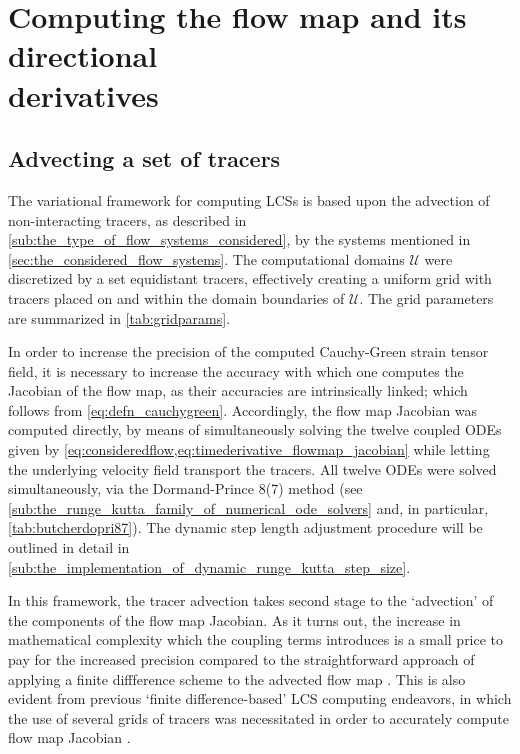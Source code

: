 \section[Computing the flow map and its directional derivatives]
{Computing the flow map and its directional\\ \phantom{3.2} derivatives}
\label{sec:computing_the_flow_map_and_its_directional_derivatives}

\subsection{Advecting a set of tracers}
\label{sub:advecting_a_set_of_tracers}

The variational framework for computing LCSs is based upon the advection of
non-interacting tracers, as described in
\cref{sub:the_type_of_flow_systems_considered}, by the systems mentioned in
\cref{sec:the_considered_flow_systems}. The computational domains $\mathcal{U}$
were discretized by a set equidistant tracers, effectively creating a
uniform grid with tracers placed on and within the domain boundaries of
$\mathcal{U}$. The grid parameters are summarized in
\cref{tab:gridparams}.



In order to increase the precision of the computed Cauchy-Green strain tensor
field, it is necessary to increase the accuracy with which one computes the
Jacobian of the flow map, as their accuracies are intrinsically linked;
which follows from \cref{eq:defn_cauchygreen}. Accordingly, the flow map
Jacobian was computed directly, by means of simultaneously solving the
twelve coupled ODEs given by
\cref{eq:consideredflow,eq:timederivative_flowmap_jacobian} while letting the
underlying velocity field transport the tracers. All twelve ODEs were solved
simultaneously, via the Dormand-Prince 8(7) method (see
\cref{sub:the_runge_kutta_family_of_numerical_ode_solvers} and, in particular,
\cref{tab:butcherdopri87}). The dynamic step length adjustment procedure
will be outlined in detail in
\cref{sub:the_implementation_of_dynamic_runge_kutta_step_size}.

In this framework, the tracer advection takes second stage to the `advection' of
the components of the flow map Jacobian. As it turns out, the increase in
mathematical complexity which the coupling terms introduces is a small price to
pay for the increased precision compared to the straightforward approach of
applying a finite diffference scheme to the advected flow map
\parencite{oettinger2016autonomous}. This is also evident from previous
`finite difference-based' LCS computing endeavors, in which the use of several
grids of tracers was necessitated in order to accurately compute flow map
Jacobian \parencite{loken2017sensitivity,farazmand2012computing}.

